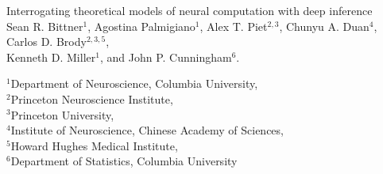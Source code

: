 \documentclass[11pt]{article}
\begin{document}
\medskip                        %

\thispagestyle{plain}
{\Large Interrogating theoretical models of neural computation with deep inference} \\
Sean R. Bittner$^{1}$, Agostina Palmigiano$^{1}$, Alex T. Piet$^{2,3}$, Chunyu A. Duan$^{4}$, Carlos D. Brody$^{2,3,5}$, \\
Kenneth D. Miller$^{1}$, and John P. Cunningham$^{6}$.

{\small
$^{1}$Department of Neuroscience, Columbia University, \\
$^{2}$Princeton Neuroscience Institute, \\
$^{3}$Princeton University, \\
$^{4}$Institute of Neuroscience, Chinese Academy of Sciences, \\
$^{5}$Howard Hughes Medical Institute, \\
$^{6}$Department of Statistics, Columbia University
}

\linenumbers
\end{document}
